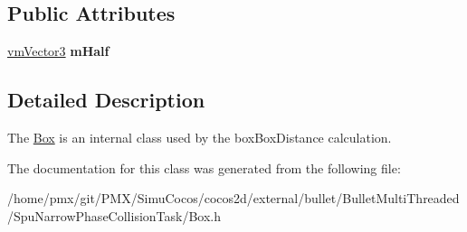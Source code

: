 \subsection*{Public Attributes}
\begin{DoxyCompactItemize}
\item 
\mbox{\label{classBox_ab161b57313f5d40ab011c6e6f8e01171}} 
\hyperlink{classVectormath_1_1Aos_1_1Vector3}{vm\+Vector3} {\bfseries m\+Half}
\end{DoxyCompactItemize}


\subsection{Detailed Description}
The \hyperlink{classBox}{Box} is an internal class used by the box\+Box\+Distance calculation. 

The documentation for this class was generated from the following file\+:\begin{DoxyCompactItemize}
\item 
/home/pmx/git/\+P\+M\+X/\+Simu\+Cocos/cocos2d/external/bullet/\+Bullet\+Multi\+Threaded/\+Spu\+Narrow\+Phase\+Collision\+Task/Box.\+h\end{DoxyCompactItemize}
